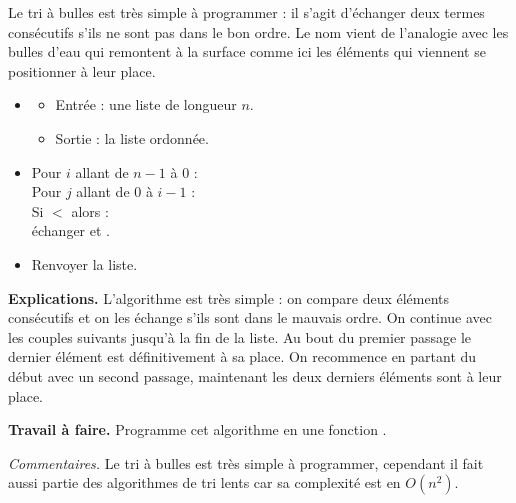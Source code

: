 \documentclass[11pt,class=report,crop=false]{standalone}
\begin{document}
\begin{activite}
	
	
	
	Le tri à bulles est très simple à programmer : il s'agit d'échanger deux termes consécutifs s'ils ne sont pas dans le bon ordre. Le nom vient de l'analogie avec les bulles d'eau qui remontent à la surface comme ici les éléments qui viennent se positionner à leur place.
	
		\begin{algorithme}
		\sauteligne 
		
		\begin{itemize}
			\item 
			\begin{itemize}
				\item Entrée : une liste de longueur $n$.			
				\item Sortie : la liste ordonnée.				
			\end{itemize}
			
			\item Pour $i$ allant de $n-1$ à $0$ :\\
				\indentation Pour $j$ allant de $0$ à $i-1$ :\\
				\indentation\indentation Si  $<$  alors :\\
				\indentation\indentation\indentation échanger  et .
			
			
			\item Renvoyer la liste.
			
		\end{itemize}
	\end{algorithme} 

	\bigskip

\textbf{Explications.}
L'algorithme est très simple : on compare deux éléments consécutifs et on les échange s'ils sont dans le mauvais ordre.
On continue avec les couples suivants jusqu'à la fin de la liste. Au bout du premier passage le dernier élément est définitivement à sa place.
On recommence en partant du début avec un second passage, maintenant les deux derniers éléments sont à leur place. 


\bigskip

\textbf{Travail à faire.} Programme cet algorithme en une fonction .

\bigskip

\emph{Commentaires.} Le tri à bulles est très simple à programmer, cependant il fait aussi partie des algorithmes de 
tri lents car sa complexité est en $O(n^2)$.
	
\end{activite}
\end{document}
